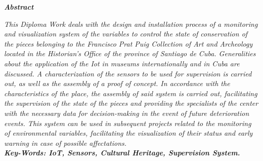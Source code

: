 \setcounter{page}{5}
\thispagestyle{plain}

    \textbf{\textit{\LARGE Abstract}}
    \newline
    
    \textit{This Diploma Work deals with the design and installation process of a monitoring and visualization system of the variables to control the state of conservation of the pieces belonging to the Francisco Prat Puig Collection of Art and Archeology located in the Historian's Office of the province of Santiago de Cuba. Generalities about the application of the Iot in museums internationally and in Cuba are discussed. A characterization of the sensors to be used for supervision is carried out, as well as the assembly of a proof of concept. In accordance with the characteristics of the place, the assembly of said system is carried out, facilitating the supervision of the state of the pieces and providing the specialists of the center with the necessary data for decision-making in the event of future deterioration events. This system can be used in subsequent projects related to the monitoring of environmental variables, facilitating the visualization of their status and early warning in case of possible affectations.}\\


    \textbf{\textit{Key-Words: IoT, Sensors, Cultural Heritage, Supervision System.}} 
